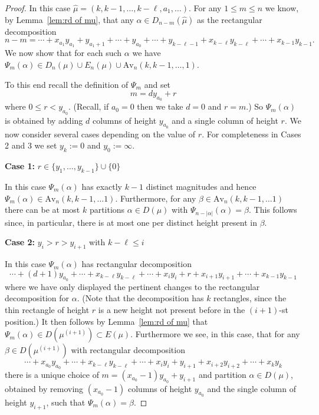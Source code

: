 \documentclass{article}
\theoremstyle{plain}
\theoremstyle{definition}
\newcommand{\Av}{\text{Av}}
\begin{document}
\begin{proof}
In this case $\hat\mu = (k,k-1,\ldots, k-\ell, a_1,\ldots).$  For any $1 \leq m \leq n$ we know, by Lemma~\ref{lem:rd of mu},  that any $\alpha \in D_{n-m}(\hat \mu)$ as the	rectangular decomposition $$ n-m = \cdots + x_{a_1}y_{a_1} + y_{a_1+1} + \cdots +y_{a_0}+ \cdots + y_{k-\ell-1}  + x_{k-\ell}y_{k-\ell}+\cdots + x_{k-1}y_{k-1}.$$
We now show that for each such $\alpha$ we have $\Psi_{m}(\alpha) \in D_n(\mu) \cup E_n(\mu) \cup \Av_n(k,k-1,\ldots, 1)$. 

To this end recall the definition of $\Psi_m$ and set 
$$m = dy_{a_0}+r$$
where $0\leq r < y_{a_0}$.  (Recall, if $a_0=0$ then we take $d=0$ and $r=m$.) So $\Psi_m(\alpha)$ is obtained by adding $d$ columns of height $y_{a_0}$ and a single column of height $r$.  We now consider several cases depending on the value of $r$.   For completeness in Cases 2 and 3 we set $y_k:= 0$ and $y_0:=\infty$.

\medskip\noindent
\textbf{Case 1: } $r \in \{y_1, \ldots, y_{k-1}\}\cup \{0\}$
\medskip

In this case $\Psi_m(\alpha)$ has exactly $k-1$ distinct magnitudes and hence $\Psi_m(\alpha)\in \Av_n(k,k-1,\ldots 1)$.  Furthermore, for any $\beta \in \Av_n(k,k-1,\ldots 1)$ there can be at most $k$ partitions $\alpha \in D(\mu)$ with $\Psi_{n-|\alpha|}(\alpha) =\beta$.  This follows since, in particular, there is at most one per distinct height present in $\beta$.


\medskip\noindent
\textbf{Case 2:} $y_i> r >y_{i+1}$ with $k-\ell \leq i$
\medskip

In this case  $\Psi_m(\alpha)$ has rectangular decomposition
$$\cdots +(d+1)y_{a_0}+ \cdots +x_{k-\ell}y_{k-\ell} + \cdots + x_{i}y_{i}+r+x_{i+1}y_{i+1}+\cdots +x_{k-1}y_{k-1}$$
where we have only displayed the pertinent changes to the rectangular decomposition for $\alpha$.  (Note that the decomposition has $k$ rectangles, since the thin rectangle of height $r$ is a new height not present before in the $(i+1)$-st position.)  It then follows by Lemma~\ref{lem:rd of mu} that $\Psi_m(\alpha)\in D(\mu^{(i+1)})\subset E(\mu)$.  Furthermore we see, in this case, that for any $\beta \in D(\mu^{(i+1)})$ with rectangular decomposition 
$$ \cdots + x_{a_0}y_{a_0} +  \cdots + x_{k-\ell}y_{k-\ell} + \cdots +x_{i}y_{i} + y_{i+1} + x_{i+2}y_{i+2} + \cdots + x_ky_k$$  
there is a unique choice of $m=(x_{a_0}-1)y_{a_0}+ y_{i+1}$ and partition $\alpha\in D(\mu)$, obtained by removing $(x_{a_0}-1)$ columns of height $y_{a_0}$ and the single column of height $y_{i+1}$, such that $\Psi_m(\alpha) = \beta$. 


\end{proof}
\end{document}
